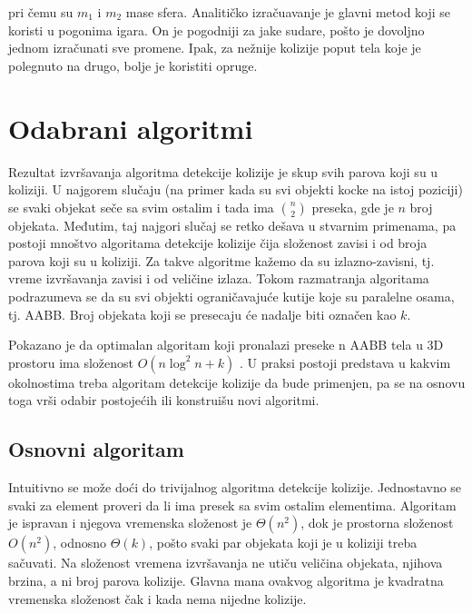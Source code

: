 \documentclass[12pt,oneside]{memoir}
\begin{document}
pri čemu su $m_1$ i $m_2$ mase sfera.
Analitičko izračuavanje je glavni metod koji se koristi u pogonima igara.
On je pogodniji za jake sudare, pošto je dovoljno jednom izračunati sve promene.
Ipak, za nežnije kolizije poput tela koje je polegnuto na drugo, bolje je koristiti opruge.

\chapter{Odabrani algoritmi}
\label{sec:algoritmi}

Rezultat izvršavanja algoritma detekcije kolizije je skup svih parova koji su u koliziji.
U najgorem slučaju (na primer kada su svi objekti kocke na istoj poziciji) se svaki objekat
seče sa svim ostalim i tada ima $ {n\choose 2}  $ preseka, gde je $n$ broj objekata. Međutim, taj najgori slučaj se retko dešava
u stvarnim primenama, pa postoji mnoštvo algoritama detekcije kolizije čija složenost zavisi i od broja
parova koji su u koliziji. Za takve algoritme kažemo da su izlazno-zavisni, tj.
vreme izvršavanja zavisi i od veličine izlaza. Tokom razmatranja algoritama podrazumeva se da su svi
objekti ograničavajuće kutije koje su paralelne osama, tj. AABB.
Broj objekata koji se presecaju će nadalje biti označen kao $k$. 

Pokazano je da optimalan algoritam koji pronalazi preseke n AABB tela u 3D prostoru ima složenost 
$O(n \log^2 n + k)$ \cite{glavna1}. 
U praksi postoji predstava u kakvim okolnostima treba algoritam detekcije kolizije da bude primenjen, pa 
se na osnovu toga vrši odabir postojećih ili konstruišu novi algoritmi.

\section{Osnovni algoritam}
\label{subsec:triv}

Intuitivno se može doći do trivijalnog algoritma detekcije kolizije. 
Jednostavno se svaki za element proveri da li ima presek sa svim ostalim elementima.
Algoritam je ispravan i njegova vremenska složenost je $\Theta (n^2) $, dok je prostorna složenost
$O(n^2)$, odnosno $\Theta(k)$, pošto svaki par objekata koji je u koliziji treba sačuvati.
Na složenost vremena izvršavanja ne utiču veličina objekata, njihova brzina, a ni broj parova kolizije.
Glavna mana ovakvog algoritma je kvadratna vremenska složenost čak i kada nema nijedne kolizije.
\end{document}
